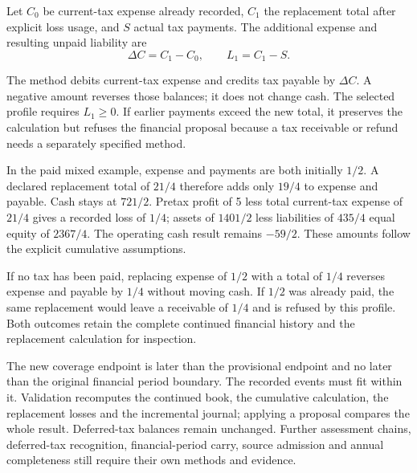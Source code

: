\begin{samepage}
Let $C_0$ be current-tax expense already recorded, $C_1$ the replacement total
after explicit loss usage, and $S$ actual tax payments. The additional expense
and resulting unpaid liability are
\[
 \Delta C=C_1-C_0,\qquad L_1=C_1-S.
\]
\end{samepage}
The method debits current-tax expense and credits tax payable by $\Delta C$.
A negative amount reverses those balances; it does not change cash. The
selected profile requires $L_1\geq0$. If earlier payments exceed the new total,
it preserves the calculation but refuses the financial proposal because a
tax receivable or refund needs a separately specified method.

In the paid mixed example, expense and payments are both initially $1/2$.
A declared replacement total of $21/4$ therefore adds only $19/4$ to expense
and payable. Cash stays at $721/2$. Pretax profit of 5 less total current-tax
expense of $21/4$ gives a recorded loss of $1/4$; assets of $1401/2$ less
liabilities of $435/4$ equal equity of $2367/4$. The operating cash result
remains $-59/2$. These amounts follow the explicit cumulative assumptions.

If no tax has been paid, replacing expense of $1/2$ with a total of $1/4$
reverses expense and payable by $1/4$ without moving cash. If $1/2$ was already
paid, the same replacement would leave a receivable of $1/4$ and is refused by
this profile. Both outcomes retain the complete continued financial history
and the replacement calculation for inspection.

The new coverage endpoint is later than the provisional endpoint and no later
than the original financial period boundary. The recorded events must fit
within it. Validation recomputes the continued book, the cumulative calculation,
the replacement losses and the incremental journal; applying a proposal compares
the whole result. Deferred-tax balances remain unchanged. Further assessment
chains, deferred-tax recognition, financial-period carry, source admission and
annual completeness still require their own methods and evidence.
